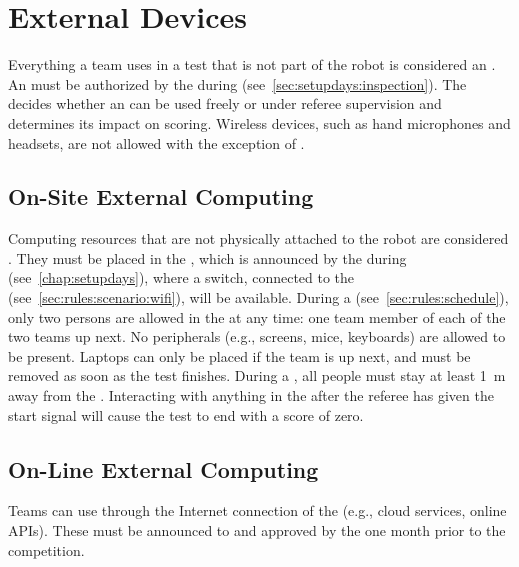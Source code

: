 %
%
\section{External Devices}
\label{sec:rules:externaldevices}
Everything a team uses in a test that is not part of the robot is considered an \ExternalDevice{}.
An \ExternalDevice{} must be authorized by the \TC{} during \RobotInspection{} (see~\ref{sec:setupdays:inspection}).
The  decides whether an \ExternalDevice{} can be used freely or under referee supervision and determines its impact on scoring.
Wireless devices, such as hand microphones and headsets, are not allowed with the exception of \ExternalComputing{}. 

\subsection{On-Site External Computing}
\label{sec:rules:onsiteexternalcomputing}
Computing resources that are not physically attached to the robot are considered \ExternalComputing{}.
They must be placed in the \ECRA{}, which is announced by the \TC{} during \SetupDays{} (see~\ref{chap:setupdays}), where a switch, connected to the \ArenaNetwork{} (see~\ref{sec:rules:scenario:wifi}), will be available.
During a \Testblock{} (see~\ref{sec:rules:schedule}), only two persons are allowed in the  at any time: one team member of each of the two teams up next. No peripherals (e.g., screens, mice, keyboards) are allowed to be present. Laptops can only be placed if the team is up next, and must be removed as soon as the test finishes.
During a \Testslot{}, all people must stay at least \SI{1}{\meter} away from the .
Interacting with anything in the  after the referee has given the start signal will cause the test to end with a score of zero.


\subsection{On-Line External Computing}
\label{sec:rules:onlineexternalcomputing}
Teams can use \ExternalComputing{} through the Internet connection of the \ArenaNetwork{} (e.g., cloud services, online APIs). These must be announced to and approved by the \TC{} one month prior to the competition.

